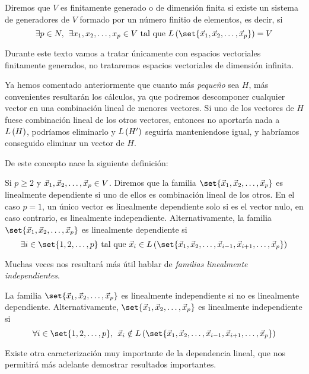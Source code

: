 \documentclass[../algebra_lineal.tex]{subfiles}
\begin{document}
\begin{definition}
    Diremos que $V$ es finitamente generado o de dimensión finita si existe un sistema de generadores de $V$ formado por un número finitio de elementos, es decir, si
    \[
        \exists p \in N, \spc \exists \dlst{x}{p} \in V \st \lspan{\set{\vlst{x}{p}}} = V
    \]  
\end{definition}

Durante este texto vamos a tratar únicamente con espacios vectoriales finitamente generados, no trataremos espacios vectoriales de dimensión infinita.

Ya hemos comentado anteriormente que cuanto más \textit{pequeño} sea $H$, más convenientes resultarán los cálculos, ya que podremos descomponer cualquier vector en una combinación lineal de menores vectores. Si uno de los vectores de $H$ fuese combinación lineal de los otros vectores, entonces no aportaría nada a $L\left(H\right)$, podríamos eliminarlo y $L\left(H'\right)$ seguiría manteniendose igual, y habríamos conseguido eliminar un vector de $H$. 

De este concepto nace la siguiente definición:

\begin{definition}
    Si $p \ge 2$ y ${\vec{x}}_{1}, {\vec{x}}_{2}, \dots, {\vec{x}}_{p} \in V$. Diremos que la familia $\set{\vlst{x}{p}}$ es linealmente dependiente si uno de ellos es combinación lineal de los otros. En el caso $p=1$, un único vector es linealmente dependiente solo si es el vector nulo, en caso contrario, es linealmente independiente. Alternativamente, la familia $\set{\vlst{x}{p}}$ es linealmente dependiente si
    \[\exists i \in \set{1, 2, \dots, p} \st \vx_i \in \lspan{\set{\vlst{x}{i-1}, \vx_{i+1}, \dots, \vx_p}}
    \]
\end{definition}

Muchas veces nos resultará más útil hablar de \textit{familias linealmente independientes}.

\begin{definition}
    La familia $\set{\vlst{x}{p}}$ es linealmente independiente si no es linealmente dependiente. Alternativamente, $\set{\vlst{x}{p}}$ es linealmente independiente si
    \[\forall i \in \set{1, 2, \dots, p}, \spc \vx_i \notin \lspan{\set{\vlst{x}{i-1}, \vx_{i+1}, \dots, \vx_p}}
    \]
\end{definition}

Existe otra caracterización muy importante de la dependencia lineal, que nos permitirá más adelante demostrar resultados importantes.
\end{document}
